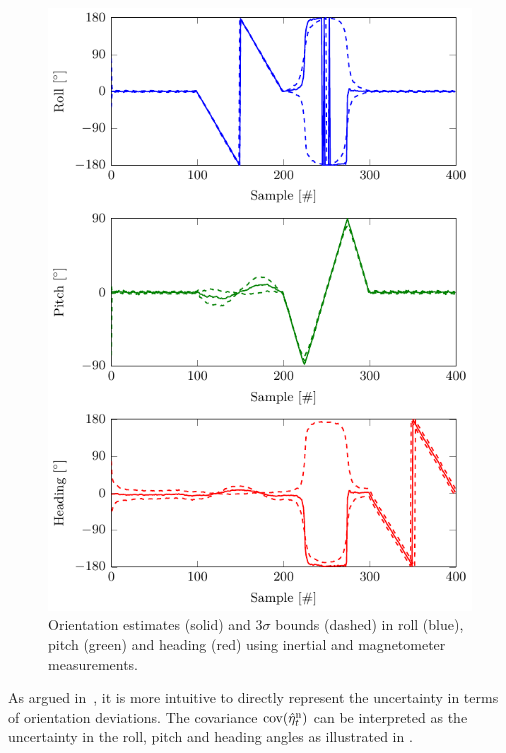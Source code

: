 \begin{figure}
	\centering
	\includegraphics[scale = 1]{figure4_8.pdf}
    	\caption{Orientation estimates (solid) and $3 \sigma$ bounds (dashed) in roll (blue), pitch (green) and heading (red) using inertial and magnetometer measurements.}
	\label{fig:oriEst-eulerAngleBounds}
\end{figure}

As argued in~\cite{forsterCDS:2016}, it is more intuitive to directly represent the uncertainty in terms of orientation deviations. The covariance $\operatorname{cov} ( \hat{\eta}_t^\text{n})$ can be interpreted as the uncertainty in the roll, pitch and heading angles as illustrated in .


